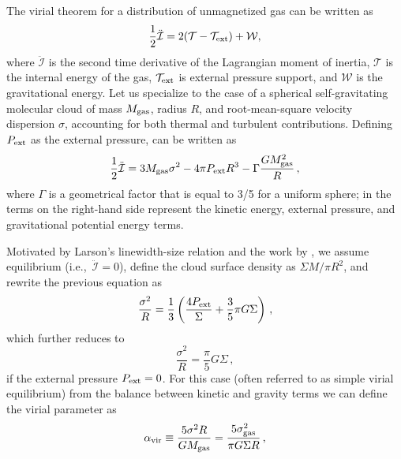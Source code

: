 \IfFileExists{emulateapjlegacy.cls}{\documentclass[iop]{emulateapjlegacy}}{\documentclass[iop]{emulateapj}}
\begin{document}
The virial theorem for a distribution of unmagnetized gas can be written as \citep{McKee92a}
\begin{equation}\label{eqn:virial_th_general}
\frac{1}{2}\ddot{\mathcal{I}} = 2(\mathcal{T} - \mathcal{T}_{\rm ext}) + \mathcal{W},
\end{equation}
where $\ddot{\mathcal{I}}$ is the second time derivative of the Lagrangian moment of inertia, $\mathcal{T}$ is the internal energy of the gas, $\mathcal{T}_{\rm ext}$ is external pressure support, and $\mathcal{W}$ is the gravitational energy.
%
Let us specialize to the case of a spherical self-gravitating molecular cloud of mass $M_{\rm gas}$, radius $R$, and root-mean-square velocity dispersion $\sigma$, accounting for both thermal and turbulent contributions. 
Defining $P_{\rm ext}$ as the external pressure,  can be written as
\begin{equation}
\frac{1}{2}{\ddot{\mathcal{I}}} = 3 M_{\rm gas} \sigma^2 - 4\pi P_{\rm ext} R^3 - \Gamma\frac{GM_{\rm gas}^2}{R}\,,
\label{eqn:virial}
\end{equation}
where $\Gamma$ is a geometrical factor that is equal to 3/5 for a uniform sphere; in  the terms on the right-hand side represent the
    kinetic energy, external pressure, and gravitational potential energy terms.

Motivated by Larson's linewidth-size relation \citep{Larson81a} and the work by \citet{Heyer09a}, we assume equilibrium (i.e.,\ ${\ddot{\mathcal{I}}}=0$), define the cloud surface density as
$\Sigma$\eq$M/\pi R^2$, and rewrite the previous equation as 
\begin{equation}
\frac{\sigma^2}{R} = \frac{1}{3}\left(\frac{4P_{\rm ext}}{\Sigma} + \frac{3}{5} \pi G \Sigma \right)\,,
\label{eqn:v0}
\end{equation}
which further reduces to 
\begin{equation}
\frac{\sigma^2}{R} = \frac{\pi}{5} G \Sigma\,,
\label{eqn:SVE}
\end{equation}
if the external pressure $P_{\rm ext}=0$. For this case (often referred to as simple virial equilibrium) from the balance between kinetic and gravity terms we can define the virial parameter as 
\begin{equation}
\alpha_{\rm vir} \equiv  \frac{5\sigma^2R}{GM_{\rm gas}} = \frac{5\sigma_{\rm gas}^2}{\pi G \Sigma R}\,,
\label{eqn:alpha}
\end{equation}
\end{document}
